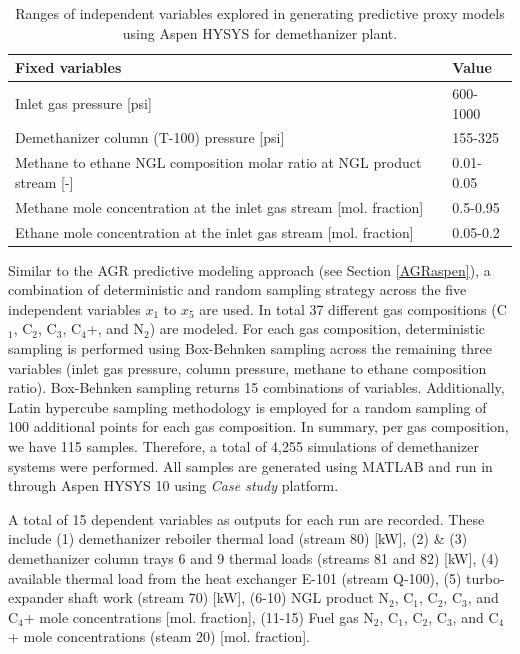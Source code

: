\documentclass[11pt]{report}
\begin{document}
\begin{table}
\begin{scriptsize}
\caption{Ranges of independent variables explored in generating predictive proxy models using Aspen HYSYS for demethanizer plant.}
\label{tab:demethanizer_aspen2}
\begin{tabular*}{1\columnwidth}{p{}p{}}
\toprule
Fixed variables & Value\\
\midrule
Inlet gas pressure {[}psi{]} & 600-1000   \\
Demethanizer column (T-100) pressure {[}psi{]}                                             & 155-325      \\
Methane to ethane NGL composition molar ratio at NGL product stream {[}-{]}                                 & 0.01-0.05    \\
Methane mole concentration at the inlet gas stream {[}mol. fraction{]}                                                           & 0.5-0.95   \\
Ethane mole concentration at the inlet gas stream {[}mol. fraction{]}                                                    & 0.05-0.2  \\
\bottomrule
\end{tabular*}
\end{scriptsize}
\end{table}

Similar to the AGR predictive modeling approach (see Section \ref{AGRaspen}), a combination of deterministic and random sampling strategy across the five independent variables $x_1$ to $x_5$ are used. In total 37 different gas compositions (C$_1$, C$_2$, C$_3$, C$_4$+, and N$_2$) are modeled. For each gas composition, deterministic sampling is performed using Box-Behnken sampling across the remaining three variables (inlet gas pressure, column pressure, methane to ethane composition ratio). Box-Behnken sampling returns 15 combinations of variables. Additionally, Latin hypercube sampling methodology is employed for a random sampling of 100 additional points for each gas composition. In summary, per gas composition, we have 115 samples. Therefore, a total of 4,255 simulations of demethanizer systems were performed. All samples are generated using MATLAB \cite{Mathworks2016} and run in through Aspen HYSYS 10 using \emph{Case study} platform.

A total of 15 dependent variables as outputs for each run are recorded. These include (1) demethanizer reboiler thermal load (stream 80) [kW], (2) \& (3) demethanizer column trays 6 and 9 thermal loads (streams 81 and 82) [kW], (4) available thermal load from the heat exchanger E-101 (stream Q-100), (5) turbo-expander shaft work (stream 70) [kW], (6-10) NGL product N$_2$, C$_1$, C$_2$, C$_3$, and C$_4$+ mole concentrations [mol. fraction], (11-15) Fuel gas N$_2$, C$_1$, C$_2$, C$_3$, and C$_4$+ mole concentrations (steam 20) [mol. fraction].
\end{document}
